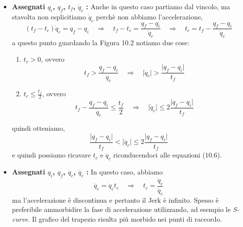 \begin{itemize}
	\item \textbf{Assegnati $q_i$, $q_f$, $t_f$, $\dot{q}_c$ :} Anche in questo caso partiamo dal vincolo, ma stavolta non esplicitiamo $\dot{q}_c$ perchè non abbiamo l'accelerazione,
		\begin{equation*}
			(t_f - t_c) \dot{q}_c = q_f - q_i \quad \Rightarrow \quad t_f - t_c = \frac{q_f - q_i}{\dot{q}_c} \quad \Rightarrow \quad t_c = t_f - \frac{q_f - q_i}{\dot{q}_c}
		\end{equation*}
		a questo punto guardando la Figura 10.2 notiamo due cose:
		\begin{enumerate}
			\item $t_c > 0$, ovvero
				\begin{equation*}
					t_f > \frac{q_f - q_i}{\dot{q}_c} \quad \Rightarrow \quad \vert \dot{q}_c \vert > \frac{\vert q_f - q_i \vert}{t_f}
				\end{equation*}
			\item $t_c \leqslant \frac{t_f}{2}$, ovvero
				\begin{equation*}
					t_f - \frac{q_f - q_i}{\dot{q}_c} \leqslant \frac{t_f}{2} \quad \Rightarrow \quad \vert \dot{q}_c \vert \leqslant 2 \frac{\vert q_f - q_i \vert}{t_f}
				\end{equation*}
		\end{enumerate}
		quindi otteniamo,
		\begin{equation}
			\frac{\vert q_f - q_i \vert}{t_f} < \vert \dot{q}_c \vert \leqslant 2 \frac{\vert q_f - q_i \vert}{t_f}
		\end{equation}
		e quindi possiamo ricavare $t_c$ e $\ddot{q}_c$ riconducendoci alle equazioni ($10.6$).
	\item \textbf{Assegnati $q_i$, $q_f$, $\dot{q}_c$, $\ddot{q}_c$ :} In questo caso, abbiamo
		\begin{equation}
			\dot{q}_c = \ddot{q}_c t_c \quad \Rightarrow \quad t_c = \frac{\dot{q}_c}{\ddot{q}_c} 
		\end{equation}
		ma l'accelerazione è discontinua e pertanto il Jerk è infinito. Spesso è preferibile ammorbidire la fase di accelerazione utilizzando, ad esempio le \emph{S-curve}. Il grafico del trapezio risulta più morbido nei punti di raccordo.
\end{itemize}

